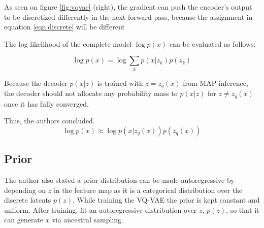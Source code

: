 As seen on figure \ref{fig:vqvae} (right), the gradient can push the encoder’s output to be discretized 
differently in the next forward pass, because the assignment in equation \ref{eqn:discrete} will be different

The log-likelihood of the complete model $\log p(x)$ can be evaluated as follows:

\begin{equation}
    \log p(x) = \log \sum _k p(x|z _k) p(z _k)
    \label{eqn:modellog}
\end{equation}

Because the decoder $p(x|z)$ is trained with $z = z _q(x)$ from MAP-inference, the decoder
should not allocate any probability mass to $p(x|z)$ for $z \neq z _q(x)$ once it has fully converged.

Thus, the authors concluded.~\cite{razavi2019generating, oord2018neural}
\begin{equation}
    \log p(x) \approx \log p(x|z _q(x))p(z _q(x))
\end{equation}

\subsection{Prior}

The author also stated a prior distribution can be made autoregressive by depending on $z$ 
in the feature map as it is a categorical distribution over the discrete latents $p(z)$. 
While training the VQ-VAE the prior is kept constant and uniform. After training, fit 
an autoregressive distribution over $z$, $p(z)$, so that it can generate $x$ via ancestral sampling.
